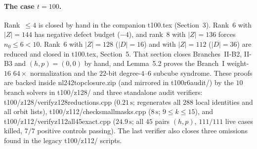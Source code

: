 \documentclass[11pt]{article}
\theoremstyle{definition}
\newcommand{\code}[1]{{\ttfamily\small\renewcommand{\_}{\textunderscore\allowbreak}#1}}
\begin{document}
\paragraph{The case $t = 100$.}
Rank~$\le 4$ is closed by hand in the companion \code{t100.tex} (Section~3).
Rank~$6$ with $|Z| = 144$ has negative defect budget ($-4$), and rank~$8$ with $|Z| = 136$ forces $n_0 \le 6 < 10$.
Rank~$6$ with $|Z| = 128$ ($|D| = 16$) and with $|Z| = 112$ ($|D| = 36$) are reduced and closed in \code{t100.tex}, Section~5.
That section closes Branches~II-B2, II-B3 and $(h,p) = (0,0)$ by hand, and Lemma~5.2 proves the Branch~I weight-$16$ $64\times$ normalization and the $22$-bit degree-$4$--$6$ subcube syndrome.
These proofs are backed inside \code{nl242\_top\_closure.zip} (and mirrored in \code{t100\_r6\_audit/}) by the $10$ branch solvers in \code{t100/z128/} and three standalone audit verifiers:
\code{t100/z128/verify\_z128\_reductions.cpp} ($0.21\,\mathrm{s}$; regenerates all $288$ local identities and all orbit lists),
\code{t100/z112/check\_small\_masks.cpp} ($8\,\mathrm{s}$; $9 \le k \le 15$), and
\code{t100/z112/verify\_z112\_all45\_exact.cpp} ($24.9\,\mathrm{s}$; all $45$ pairs $(h,p)$, $111/111$ live cases killed, $7/7$ positive controls passing).
The last verifier also closes three omissions found in the legacy \code{t100/z112/} scripts.
\end{document}
